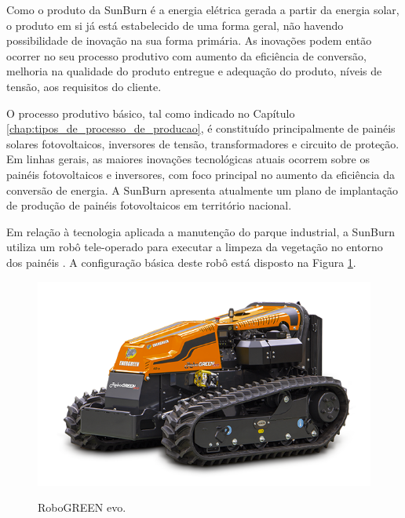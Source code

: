 Como o produto da SunBurn é a energia elétrica gerada a partir da energia solar, o produto em si já está estabelecido de uma forma geral, não havendo possibilidade de inovação na sua forma primária. As inovações podem então ocorrer no seu processo produtivo com aumento da eficiência de conversão, melhoria na qualidade do produto entregue e adequação do produto, níveis de tensão, aos requisitos do cliente.

O processo produtivo básico, tal como indicado no Capítulo \ref{chap:tipos_de_processo_de_producao}, é constituído principalmente de painéis solares fotovoltaicos, inversores de tensão, transformadores e circuito de proteção. Em linhas gerais, as maiores inovações tecnológicas atuais ocorrem sobre os painéis fotovoltaicos e inversores, com foco principal no aumento da eficiência da conversão de energia. A SunBurn apresenta atualmente um plano de implantação de produção de painéis fotovoltaicos em território nacional.

Em relação à tecnologia aplicada a manutenção do parque industrial, a SunBurn utiliza um robô tele-operado para executar a limpeza da vegetação no entorno dos painéis \cite{energreen}. A configuração básica deste robô está disposto na Figura \ref{fig:energreen}.

\begin{figure}[H]
  \caption{RoboGREEN evo.}
  \includegraphics[width=1\textwidth]{images/robogreen_evo.png}
  \label{fig:energreen}
\end{figure}
